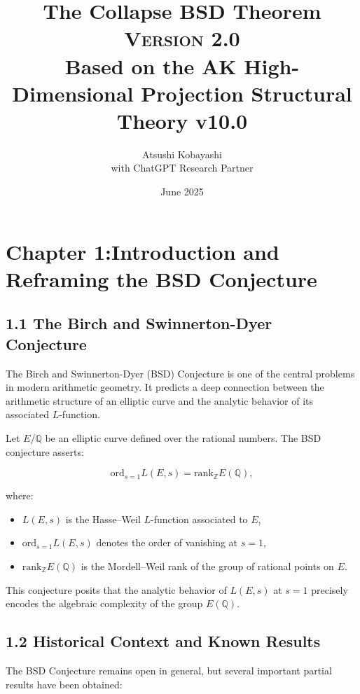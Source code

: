 \documentclass[11pt]{article}
\title{The Collapse BSD Theorem \\ 
\Large \textsc{Version 2.0} \\
\small Based on the AK High-Dimensional Projection Structural Theory v10.0}
\author{Atsushi Kobayashi \\ \small with ChatGPT Research Partner}
\date{June 2025}
\newcommand{\QQ}{\mathbb{Q}}
\newcommand{\ZZ}{\mathbb{Z}}
\begin{document}
\maketitle
\tableofcontents
\newpage




\section{Chapter 1:Introduction and Reframing the BSD Conjecture}

\subsection{1.1 The Birch and Swinnerton-Dyer Conjecture}

The Birch and Swinnerton-Dyer (BSD) Conjecture is one of the central problems in modern arithmetic geometry.  
It predicts a deep connection between the arithmetic structure of an elliptic curve and the analytic behavior of its associated $L$-function.

Let $E/\QQ$ be an elliptic curve defined over the rational numbers.  
The BSD conjecture asserts:

\begin{equation}
\label{eq:bsd}
\mathrm{ord}_{s=1} L(E,s) = \mathrm{rank}_{\ZZ} E(\QQ),
\end{equation}

where:
\begin{itemize}
  \item $L(E,s)$ is the Hasse–Weil $L$-function associated to $E$,
  \item $\mathrm{ord}_{s=1} L(E,s)$ denotes the order of vanishing at $s=1$,
  \item $\mathrm{rank}_{\ZZ} E(\QQ)$ is the Mordell–Weil rank of the group of rational points on $E$.
\end{itemize}

This conjecture posits that the analytic behavior of $L(E,s)$ at $s=1$ precisely encodes the algebraic complexity of the group $E(\QQ)$.

\subsection{1.2 Historical Context and Known Results}

The BSD Conjecture remains open in general, but several important partial results have been obtained:
\end{document}
